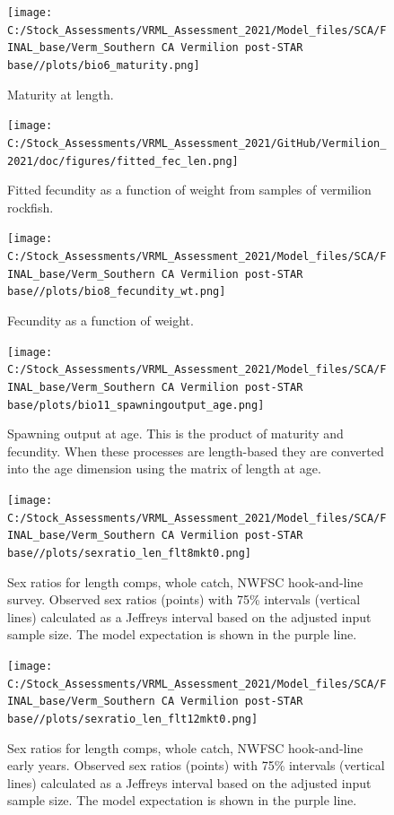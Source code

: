 \documentclass[11pt,
  english,
]{article}
\begin{document}
\begin{figure}
\centering
\texttt{[image: C:/Stock\_Assessments/VRML\_Assessment\_2021/Model\_files/SCA/FINAL\_base/Verm\_Southern CA Vermilion post-STAR base//plots/bio6\_maturity.png]}
\caption{Maturity at length.\label{fig:maturity}}
\end{figure}

\begin{figure}
\centering
\texttt{[image: C:/Stock\_Assessments/VRML\_Assessment\_2021/GitHub/Vermilion\_2021/doc/figures/fitted\_fec\_len.png]}
\caption{Fitted fecundity as a function of weight from samples of vermilion rockfish.\label{fig:fitted-fecundity}}
\end{figure}

\begin{figure}
\centering
\texttt{[image: C:/Stock\_Assessments/VRML\_Assessment\_2021/Model\_files/SCA/FINAL\_base/Verm\_Southern CA Vermilion post-STAR base//plots/bio8\_fecundity\_wt.png]}
\caption{Fecundity as a function of weight.\label{fig:fecundity}}
\end{figure}

\begin{figure}
\centering
\texttt{[image: C:/Stock\_Assessments/VRML\_Assessment\_2021/Model\_files/SCA/FINAL\_base/Verm\_Southern CA Vermilion post-STAR base/plots/bio11\_spawningoutput\_age.png]}
\caption{Spawning output at age. This is the product of maturity and fecundity. When these processes are length-based they are converted into the age dimension using the matrix of length at age.\label{fig:spawnage}}
\end{figure}

\FloatBarrier

\begin{figure}
\centering
\texttt{[image: C:/Stock\_Assessments/VRML\_Assessment\_2021/Model\_files/SCA/FINAL\_base/Verm\_Southern CA Vermilion post-STAR base//plots/sexratio\_len\_flt8mkt0.png]}
\caption{Sex ratios for length comps, whole catch, NWFSC hook-and-line survey. Observed sex ratios (points) with 75\% intervals (vertical lines) calculated as a Jeffreys interval based on the adjusted input sample size. The model expectation is shown in the purple line.\label{fig:sexratio-NWFSC-HKL-3}}
\end{figure}

\begin{figure}
\centering
\texttt{[image: C:/Stock\_Assessments/VRML\_Assessment\_2021/Model\_files/SCA/FINAL\_base/Verm\_Southern CA Vermilion post-STAR base//plots/sexratio\_len\_flt12mkt0.png]}
\caption{Sex ratios for length comps, whole catch, NWFSC hook-and-line early years. Observed sex ratios (points) with 75\% intervals (vertical lines) calculated as a Jeffreys interval based on the adjusted input sample size. The model expectation is shown in the purple line.\label{fig:sexratio-EARLY-HKL-2}}
\end{figure}
\end{document}
